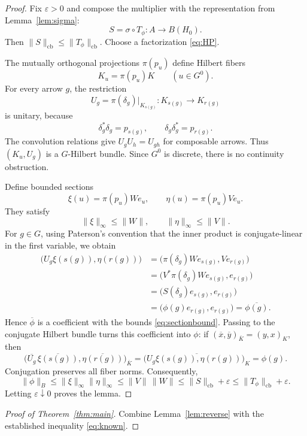 \documentclass[11pt]{article}
\theoremstyle{remark}
\newcommand{\cb}{\mathrm{cb}}
\begin{document}
\begin{proof}
Fix \(\varepsilon>0\) and compose the multiplier with the representation from
Lemma~\ref{lem:sigma}:
\[
 S=\sigma\circ T_\phi:A\longrightarrow B(H_0).
\]
Then \(\|S\|_{\cb}\leq\|T_\phi\|_{\cb}\).  Choose a factorization
\eqref{eq:HP}.

The mutually orthogonal projections \(\pi(p_u)\) define Hilbert fibers
\[
 K_u=\pi(p_u)K\qquad(u\in G^0).
\]
For every arrow \(g\), the restriction
\[
 U_g=\pi(\delta_g)|_{K_{s(g)}}:K_{s(g)}\longrightarrow K_{r(g)}
\]
is unitary, because
\[
 \delta_g^*\delta_g=p_{s(g)},\qquad
 \delta_g\delta_g^*=p_{r(g)}.
\]
The convolution relations give \(U_gU_h=U_{gh}\) for composable arrows.
Thus \((K_u,U_g)\) is a \(G\)-Hilbert bundle.  Since \(G^0\) is discrete,
there is no continuity obstruction.

Define bounded sections
\[
 \xi(u)=\pi(p_u)We_u,\qquad
 \eta(u)=\pi(p_u)Ve_u.
\]
They satisfy
\begin{equation}\label{eq:sectionbound}
 \|\xi\|_\infty\leq\|W\|,\qquad
 \|\eta\|_\infty\leq\|V\|.
\end{equation}
For \(g\in G\), using Paterson's convention that the inner product is
conjugate-linear in the first variable, we obtain
\begin{align*}
 \bigl(U_g\xi(s(g)),\eta(r(g))\bigr)
 &=\bigl(\pi(\delta_g)We_{s(g)},Ve_{r(g)}\bigr)\\
 &=\bigl(V^*\pi(\delta_g)We_{s(g)},e_{r(g)}\bigr)\\
 &=\bigl(S(\delta_g)e_{s(g)},e_{r(g)}\bigr)\\
 &=\bigl(\phi(g)e_{r(g)},e_{r(g)}\bigr)
 =\overline{\phi(g)}.
\end{align*}
Hence \(\overline\phi\) is a coefficient with the bounds
\eqref{eq:sectionbound}.  Passing to the conjugate Hilbert bundle turns this
coefficient into \(\phi\): if
\((\overline{x},\overline{y})_{\overline K}=(y,x)_K\), then
\[
 \bigl(\overline{U_g}\,\overline{\xi(s(g))},
       \overline{\eta(r(g))}\bigr)_{\overline K}
 =
 \overline{
 \bigl(U_g\xi(s(g)),\eta(r(g))\bigr)_K}
 =\phi(g).
\]
Conjugation preserves all fiber norms.  Consequently,
\[
 \|\phi\|_B
 \leq\|\xi\|_\infty\|\eta\|_\infty
 \leq\|V\|\,\|W\|
 \leq\|S\|_{\cb}+\varepsilon
 \leq\|T_\phi\|_{\cb}+\varepsilon.
\]
Letting \(\varepsilon\downarrow0\) proves the lemma.
\end{proof}

\begin{proof}[Proof of Theorem~\ref{thm:main}]
Combine Lemma~\ref{lem:reverse} with the established inequality
\eqref{eq:known}.
\end{proof}
\end{document}
